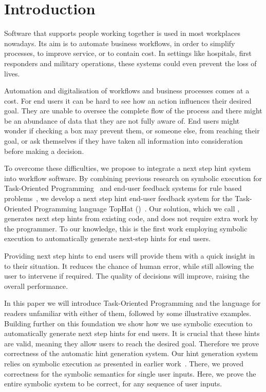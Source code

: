 
\section{Introduction}
\label{sec:intro}

Software that supports people working together is used in most workplaces nowadays.
Its aim is to automate business workflows, in order to simplify processes, to improve service, or to contain cost.
In settings like hospitals, first responders and military operations, these systems could even prevent the loss of lives.

Automation and digitalisation of workflows and business processes comes at a cost.
For end users it can be hard to see how an action influences their desired goal.
They are unable to oversee the complete flow of the process
and there might be an abundance of data that they are not fully aware of.
End users might wonder if checking a box may prevent them, or someone else, from reaching their goal,
or ask themselves if they have taken all information into consideration before making a decision.

To overcome these difficulties, we propose to integrate a next step hint system into workflow software.
By combining previous research on symbolic execution for Task-Oriented Programming~\cite{Naus2019} and end-user feedback systems for rule based problems~\cite{DBLP:conf/sfp/NausJ16},
we develop a next step hint end-user feedback system for the Task-Oriented Programming language TopHat (\TOPHAT)~\cite{DBLP:conf/ppdp/SteenvoordenNK19}.
Our solution, which we call \ASTOPHAT, generates next step hints from existing code, and does not require extra work by the programmer.
To our knowledge, this is the first work employing symbolic execution to automatically generate next-step hints for end users.

Providing next step hints to end users will provide them with a quick insight in to their situation.
It reduces the chance of human error, while still allowing the user to intervene if required.
The quality of decisions will improve, raising the overall performance.

In this paper we will introduce Task-Oriented Programming and the \TOPHAT language for readers unfamiliar with either of them,
followed by some illustrative examples.
Building further on this foundation we show how we use symbolic execution to automatically generate next step hints for end users.
It is crucial that these hints are valid, meaning they allow users to reach the desired goal.
Therefore we prove correctness of the automatic hint generation system.
Our hint generation system relies on symbolic execution as presented in earlier work~\cite{Naus2019}.
There, we proved correctness for the symbolic semantics for single user inputs.
Here, we prove the entire symbolic system to be correct, for any sequence of user inputs.



